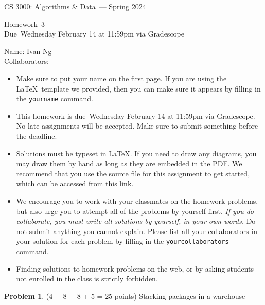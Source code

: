 \documentclass[11pt]{article}
\newcommand{\yourname}{Ivan Ng}
\newcommand{\yourcollaborators}{}
\theoremstyle{definition}
\theoremstyle{theorem}
\newtheorem{prob}{Problem}
\newcommand{\course}{CS 3000: Algorithms \& Data}
\newcommand{\semester}{Spring 2024}
\newcommand{\hwnum}{3}
\newcommand{\hwdue}{Wednesday February 14 at 11:59pm via Gradescope}
\begin{document}
{\Large 
\begin{center} \course\ --- \semester\ \end{center}}
{\large
\vspace{10pt}
\noindent Homework~\hwnum \vspace{2pt}\\
Due~\hwdue}

\vspace{15pt}
\bigskip
{\large
\noindent Name: \yourname \vspace{2pt}\\ Collaborators: \yourcollaborators}

\vspace{15pt}
\begin{itemize}

\item
  Make sure to put your name on the first page.  If you are using the
  \LaTeX~template we provided, then you can make sure it appears by
  filling in the \texttt{yourname} command.

\item This homework is due~\hwdue.  No late assignments will be accepted.  Make sure to submit something before the deadline.

\item Solutions must be typeset in \LaTeX.  If you need to draw any diagrams,
  you may draw them by hand as long as they are embedded in the PDF.
  We recommend that you use the source file for this assignment to get started, which can be accessed from \href{https://www.overleaf.com/read/jycrjmrdprmm#0c8372}{this} link.

\item We encourage you to work with your classmates on the homework
  problems, but also urge you to attempt all of the problems by
  yourself first. \emph{If you do collaborate, you must write all
    solutions by yourself, in your own words.}  Do not submit anything
  you cannot explain.  Please list all your collaborators in your
  solution for each problem by filling in the
  \texttt{yourcollaborators} command.

\item Finding solutions to homework problems on the web, or by asking
  students not enrolled in the class is strictly forbidden.

\end{itemize}
\newpage

\begin{prob}
	(4 + 8 + 8 + 5 = 25 points) Stacking packages in a warehouse
\end{prob}
\end{document}
